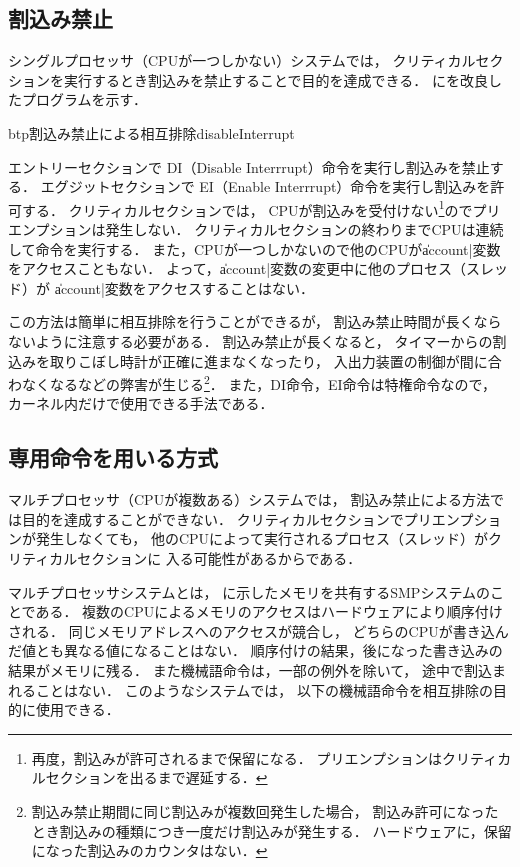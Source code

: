 \subsection{割込み禁止}
\label{disableInterrupt}
シングルプロセッサ（CPUが一つしかない）システムでは，
クリティカルセクションを実行するとき割込みを禁止することで目的を達成できる．
にを改良したプログラムを示す．

\begin{myfig}{btp}{割込み禁止による相互排除}{disableInterrupt}
  
\end{myfig}

エントリーセクションで
DI（Disable Interrrupt）命令を実行し割込みを禁止する．
エグジットセクションで
EI（Enable Interrrupt）命令を実行し割込みを許可する．
クリティカルセクションでは，
CPUが割込みを受付けない\footnote{
  再度，割込みが許可されるまで保留になる．
  プリエンプションはクリティカルセクションを出るまで遅延する．
}のでプリエンプションは発生しない．
クリティカルセクションの終わりまでCPUは連続して命令を実行する．
また，CPUが一つしかないので他のCPUが\|account|変数をアクセスこともない．
よって，\|account|変数の変更中に他のプロセス（スレッド）が
\|account|変数をアクセスすることはない．

この方法は簡単に相互排除を行うことができるが，
割込み禁止時間が長くならないように注意する必要がある．
割込み禁止が長くなると，
タイマーからの割込みを取りこぼし時計が正確に進まなくなったり，
入出力装置の制御が間に合わなくなるなどの弊害が生じる\footnote{
  割込み禁止期間に同じ割込みが複数回発生した場合，
  割込み許可になったとき割込みの種類につき一度だけ割込みが発生する．
  ハードウェアに，保留になった割込みのカウンタはない．}．
また，DI命令，EI命令は特権命令なので，
カーネル内だけで使用できる手法である．

\subsection{専用命令を用いる方式}
マルチプロセッサ（CPUが複数ある）システムでは，
割込み禁止による方法では目的を達成することができない．
クリティカルセクションでプリエンプションが発生しなくても，
他のCPUによって実行されるプロセス（スレッド）がクリティカルセクションに
入る可能性があるからである．

マルチプロセッサシステムとは，
に示したメモリを共有するSMPシステムのことである．
複数のCPUによるメモリのアクセスはハードウェアにより順序付けされる．
同じメモリアドレスへのアクセスが競合し，
どちらのCPUが書き込んだ値とも異なる値になることはない．
順序付けの結果，後になった書き込みの結果がメモリに残る．
また機械語命令は，一部の例外を除いて，
途中で割込まれることはない．
このようなシステムでは，
以下の機械語命令を相互排除の目的に使用できる．

